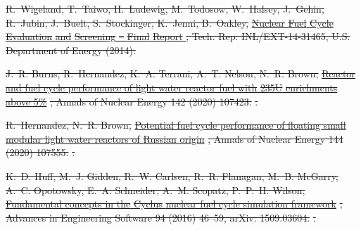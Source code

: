 \documentclass[preprint]{elsarticle}
\providecommand{\DIFdeltex}[1]{{\protect\color{red}\sout{#1}}}                      %
\providecommand{\DIFdel}[1]{\texorpdfstring{\DIFdeltex{#1}}{}} %
\begin{document}
\DIFdel{R.~Wigeland, T.~Taiwo, H.~Ludewig, M.~Todosow, W.~Halsey, J.~Gehin, R.~Jubin,
  J.~Buelt, S.~Stockinger, K.~Jenni, B.~Oakley,
  }\href{https://fuelcycleevaluation.inl.gov}{\DIFdel{Nuclear }%
\DIFdel{Fuel}%
\DIFdel{Cycle}%
\DIFdel{Evaluation}%
\DIFdel{and }%
\DIFdel{Screening}%
\DIFdel{-- }%
\DIFdel{Final}%
\DIFdel{Report}%
}%
\DIFdel{, Tech. Rep.
  INL/EXT-14-31465, U.S. Department of Energy (2014).
}%

\DIFdel{J.~R. Burns, R.~Hernandez, K.~A. Terrani, A.~T. Nelson, N.~R. Brown,
  }\href{https://www.sciencedirect.com/science/article/pii/S0306454920301213}{\DIFdel{Reactor
  and fuel cycle performance of light water reactor fuel with }%
\DIFdel{235U}%
\DIFdel{enrichments above 5\%}}%
\DIFdel{, Annals of Nuclear Energy 142 (2020) 107423.
}%
\href {http://dx.doi.org/10.1016/j.anucene.2020.107423}
  {%
}%
\DIFdel{.
}%

\DIFdel{R.~Hernandez, N.~R. Brown,
  }\href{http://www.sciencedirect.com/science/article/pii/S030645492030253X}{\DIFdel{Potential
  fuel cycle performance of floating small modular light water reactors of
  }%
\DIFdel{Russian}%
\DIFdel{origin}}%
\DIFdel{, Annals of Nuclear Energy 144 (2020) 107555.
}%
\href {http://dx.doi.org/10.1016/j.anucene.2020.107555}
  {%
}%
\DIFdel{.
}%

\DIFdel{K.~D. Huff, M.~J. Gidden, R.~W. Carlsen, R.~R. Flanagan, M.~B. McGarry, A.~C.
  Opotowsky, E.~A. Schneider, A.~M. Scopatz, P.~P.~H. Wilson,
  }\href{http://www.sciencedirect.com/science/article/pii/S0965997816300229}{\DIFdel{Fundamental
  concepts in the }%
\DIFdel{Cyclus}%
\DIFdel{nuclear fuel cycle simulation framework}}%
\DIFdel{, Advances
  in Engineering Software 94 (2016) 46--59, arXiv: 1509.03604.
}%
\href {http://dx.doi.org/10.1016/j.advengsoft.2016.01.014}
  {%
}%
\DIFdel{.
}%
\end{document}
